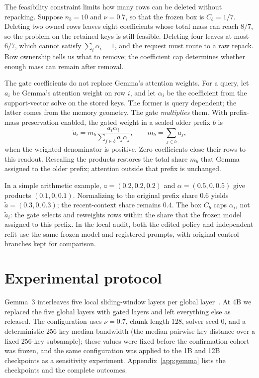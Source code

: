 The feasibility constraint limits how many rows can be deleted without repacking.
Suppose \(n_b=10\) and \(\nu=0.7\), so that the frozen box is \(C_b=1/7\).
Deleting two owned rows leaves eight coefficients whose total mass can reach
\(8/7\), so the problem on the retained keys is still feasible. Deleting four leaves at
most \(6/7\), which cannot satisfy \(\sum_i\alpha_i=1\), and the request must
route to a raw repack. Row ownership tells us what to remove; the coefficient
cap determines whether enough mass can remain after removal.

The gate coefficients do not replace Gemma's attention weights. For a query,
let $a_i$ be Gemma's attention weight on row $i$, and let $\alpha_i$ be the
coefficient from the support-vector solve on the stored keys. The former is
query dependent; the latter comes from the memory geometry. The gate
\emph{multiplies} them. With prefix-mass preservation enabled, the gated
weight in a sealed older prefix $b$ is
\begin{equation}
\widetilde a_i
= m_b\frac{a_i\alpha_i}{\sum_{j\in b}a_j\alpha_j},
\qquad m_b=\sum_{j\in b}a_j,
\label{eq:attention-gate}
\end{equation}
when the weighted denominator is positive. Zero coefficients close their rows
to this readout. Rescaling the products restores the total share $m_b$ that
Gemma assigned to the older prefix; attention outside that prefix is unchanged.

In a simple arithmetic example, $a=(0.2,0.2,0.2)$ and
$\alpha=(0.5,0,0.5)$ give products
$(0.1,0,0.1)$. Normalizing to the original prefix share $0.6$ yields
$\widetilde a=(0.3,0,0.3)$; the recent-context share remains $0.4$.
The box $C_b$ caps $\alpha_i$, not $\widetilde a_i$: the gate selects and
reweights rows within the share that the frozen model assigned to this
prefix. In the local audit, both the edited policy and independent refit use
the same frozen model and registered prompts, with original control branches
kept for comparison.


\section{Experimental protocol}\label{sec:protocol}

Gemma~3 interleaves five local sliding-window layers per global
layer~\citep{gemma3}. At 4B we replaced the five global layers with gated
layers and left everything else as released. The configuration uses \(\nu=0.7\),
chunk length 128, solver seed 0, and a deterministic 256-key median bandwidth
(the median pairwise key distance over a fixed 256-key subsample);
these values were fixed before the confirmation cohort was frozen, and the same
configuration was applied to the 1B and 12B checkpoints as a sensitivity experiment.
Appendix~\ref{app:gemma} lists the checkpoints and the complete outcomes.

